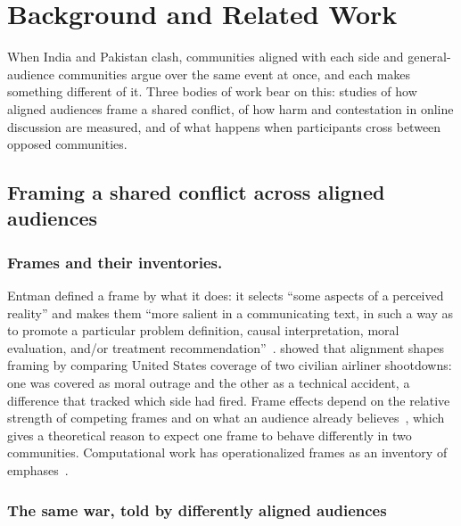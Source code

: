 \section{Background and Related Work}

When India and Pakistan clash, communities aligned with each side and general-audience communities argue over the same event at once, and each makes something different of it. Three bodies of work bear on this: studies of how aligned audiences frame a shared conflict, of how harm and contestation in online discussion are measured, and of what happens when participants cross between opposed communities.

\subsection{Framing a shared conflict across aligned audiences}
\label{sec:rw-conflict}



\subsubsection{Frames and their inventories.}

Entman defined a frame by what it does: it selects ``some aspects of a perceived reality'' and makes them ``more salient in a communicating text, in such a way as to promote a particular problem definition, causal interpretation, moral evaluation, and/or treatment recommendation''~\cite{entman1993framing}. \citet{entman1991kal} showed that alignment shapes framing by comparing United States coverage of two civilian airliner shootdowns: one was covered as moral outrage and the other as a technical accident, a difference that tracked which side had fired. Frame effects depend on the relative strength of competing frames and on what an audience already believes~\cite{chongdruckman2007framing}, which gives a theoretical reason to expect one frame to behave differently in two communities. Computational work has operationalized frames as an inventory of emphases~\cite{card2015mediaframes,mendelsohn2021framing}.


\subsubsection{The same war, told by differently aligned audiences}

